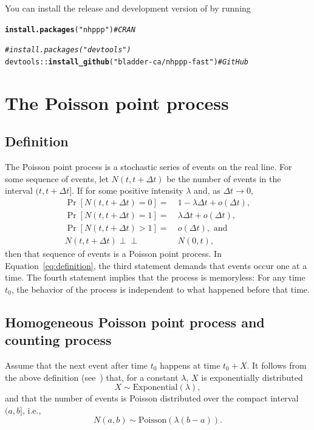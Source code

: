 \documentclass[article]{jss}\usepackage[]{graphicx}\usepackage[]{xcolor}
\makeatletter
\newcommand{\hlstr}[1]{\textcolor[rgb]{0.192,0.494,0.8}{#1}}%
\newcommand{\hlcom}[1]{\textcolor[rgb]{0.678,0.584,0.686}{\textit{#1}}}%
\newcommand{\hlopt}[1]{\textcolor[rgb]{0,0,0}{#1}}%
\newcommand{\hlstd}[1]{\textcolor[rgb]{0.345,0.345,0.345}{#1}}%
\newcommand{\hlkwd}[1]{\textcolor[rgb]{0.737,0.353,0.396}{\textbf{#1}}}%
\newenvironment{kframe}{%
 \def\at@end@of@kframe{}%
 \ifinner\ifhmode%
  \def\at@end@of@kframe{\end{minipage}}%
  \begin{minipage}{\columnwidth}%
 \fi\fi%
 \def\FrameCommand##1{\hskip\@totalleftmargin \hskip-\fboxsep
 \colorbox{shadecolor}{##1}\hskip-\fboxsep
     \hskip-\linewidth \hskip-\@totalleftmargin \hskip\columnwidth}%
 \MakeFramed {\advance\hsize-\width
   \@totalleftmargin\z@ \linewidth\hsize
   \@setminipage}}%
 {\par\unskip\endMakeFramed%
 \at@end@of@kframe}
\newenvironment{knitrout}{}{} %
\newcommand{\indep}{\perp \!\!\! \perp}
\makeatother
\begin{document}
You can install the release and development version of  by running
\begin{knitrout}
\color{fgcolor}\begin{kframe}
\begin{alltt}
\hlkwd{install.packages}\hlstd{(}\hlstr{"nhppp"}\hlstd{)} \hlcom{# CRAN}

\hlcom{# install.packages("devtools")}
\hlstd{devtools}\hlopt{::}\hlkwd{install_github}\hlstd{(}\hlstr{"bladder-ca/nhppp-fast"}\hlstd{)} \hlcom{# GitHub}
\end{alltt}
\end{kframe}
\end{knitrout}

\section{The Poisson point process} \label{sec:review}
\subsection{Definition}
The Poisson point process is a stochastic series of events on the real line. For some sequence of events, let $N(t, t + \Delta t)$ be the number of events in the interval $(t, t  + \Delta t]$. If for some positive intensity $\lambda$ and, as ${\Delta t \rightarrow 0}$,
\begin{equation}\label{eq:definition}
    \begin{aligned}
    \Pr[N(t, t + \Delta t) = 0] =&\  1 - \lambda \Delta t +  o(\Delta t), \\
    \Pr[N(t, t + \Delta t) = 1] =&\  \lambda \Delta t +  o(\Delta t), \\
    \Pr[N(t, t + \Delta t) >1] =&\  o(\Delta t),\text{ and } \\
    N(t, t + \Delta t) \indep&\ N(0, t),
    \end{aligned}
\end{equation}
then that sequence of events is a Poisson point process. In Equation~\eqref{eq:definition}, the third statement demands that events occur one at a time. The fourth statement implies that the process is memoryless: For any time $t_0$, the behavior of the process is independent to what happened before that time.

\subsection{Homogeneous Poisson point process and counting process}\label{sec:ppp-intro}
Assume that the next event after time $t_0$ happens at time $t_0 + X$. It follows from the above definition (see~\citet[par. 4.1]{cox1965theory}) that, for a constant $\lambda$, $X$ is exponentially distributed
\begin{equation}\label{eq:X_PPP}
X \sim \text{Exponential}(\lambda),
\end{equation}
and that the number of events is Poisson distributed over the compact interval $(a, b]$, i.e.,
\begin{equation}\label{eq:N_PPP}
N(a, b) \sim \text{Poisson}(\lambda (b-a)).
\end{equation}
\end{document}
